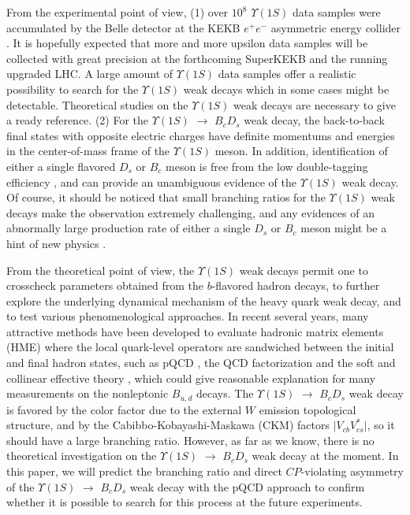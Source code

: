 \documentclass[preprint,superscriptaddress,nofootinbib]{revtex4}
\begin{document}
  From the experimental point of view,
  (1)
  over $10^{8}$ ${\Upsilon}(1S)$ data samples were
  accumulated by the Belle detector at the KEKB $e^{+}e^{-}$
  asymmetric energy collider \cite{1212.5342}.
  It is hopefully expected that more and more upsilon data
  samples will be collected with great precision at the
  forthcoming SuperKEKB and the running upgraded LHC.
  A large amount of ${\Upsilon}(1S)$ data
  samples offer a realistic possibility to search for
  the ${\Upsilon}(1S)$ weak decays which in some cases
  might be detectable.
  Theoretical studies on the ${\Upsilon}(1S)$
  weak decays are necessary to give a ready
  reference.
  (2)
  For the ${\Upsilon}(1S)$ ${\to}$ $B_{c}D_{s}$ weak decay,
  the back-to-back final states with opposite electric charges
  have definite momentums and energies in the center-of-mass
  frame of the ${\Upsilon}(1S)$ meson.
  In addition, identification of either a single
  flavored $D_{s}$ or $B_{c}$ meson is free from the low
  double-tagging efficiency \cite{zpc62.271},
  and can provide an unambiguous evidence of the
  ${\Upsilon}(1S)$ weak decay.
  Of course, it should be noticed that small branching ratios
  for the ${\Upsilon}(1S)$ weak decays make the observation
  extremely challenging, and any evidences of an abnormally
  large production rate of either a single $D_{s}$ or $B_{c}$
  meson might be a hint of new physics \cite{zpc62.271}.

  From the theoretical point of view,
  the ${\Upsilon}(1S)$ weak decays permit one to crosscheck
  parameters obtained from the $b$-flavored hadron decays,
  to further explore the underlying dynamical mechanism of
  the heavy quark weak decay, and to test various
  phenomenological approaches.
  In recent several years, many attractive methods have been
  developed to evaluate hadronic matrix elements (HME) where
  the local quark-level operators are sandwiched between
  the initial and final hadron states,
  such as pQCD \cite{pqcd1,pqcd2,pqcd3},
  the QCD factorization \cite{qcdf2}
  and the soft and collinear effective theory
  \cite{scet1,scet2,scet3,scet4},
  which could give reasonable explanation for
  many measurements on the nonleptonic $B_{u,d}$ decays.
  The ${\Upsilon}(1S)$ ${\to}$ $B_{c}D_{s}$ weak decay
  is favored by the color factor due to the external
  $W$ emission topological structure, and by the
  Cabibbo-Kobayashi-Maskawa (CKM) factors
  ${\vert}V_{cb}V_{cs}^{\ast}{\vert}$, so it should
  have a large branching ratio.
  However, as far as we know, there is no theoretical
  investigation on the ${\Upsilon}(1S)$ ${\to}$
  $B_{c}D_{s}$ weak decay at the moment.
  In this paper, we will predict the branching ratio
  and direct $CP$-violating asymmetry of the
  ${\Upsilon}(1S)$ ${\to}$ $B_{c}D_{s}$ weak decay
  with the pQCD approach to confirm whether it is
  possible to search for this process at the future
  experiments.
\end{document}
